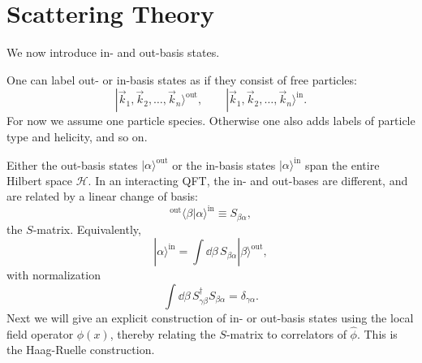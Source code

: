 \section{Scattering Theory}

We now introduce in- and out-basis states.

\begin{center}
\end{center}

One can label out- or in-basis states as if they consist of free particles:
\[
  |\vec k_1,\vec k_2,\ldots,\vec k_n\rangle^{\mathrm{out}},
  \qquad
  |\vec k_1,\vec k_2,\ldots,\vec k_n\rangle^{\mathrm{in}}.
\]
For now we assume one particle species. Otherwise one also adds labels of
particle type and helicity, and so on.

Either the out-basis states \(|\alpha\rangle^{\mathrm{out}}\) or the in-basis
states \(|\alpha\rangle^{\mathrm{in}}\) span the entire Hilbert space
\(\mathcal H\). In an interacting QFT, the in- and out-bases are different,
and are related by a linear change of basis:
\[
  {}^{\mathrm{out}}\langle\beta|\alpha\rangle^{\mathrm{in}}
  \equiv S_{\beta\alpha},
\]
the \(S\)-matrix. Equivalently,
\[
  |\alpha\rangle^{\mathrm{in}}
  =
  \int\dd\beta\,
  S_{\beta\alpha}|\beta\rangle^{\mathrm{out}},
\]
with normalization
\[
  \int\dd\beta\,
  S_{\gamma\beta}^{\dagger}S_{\beta\alpha}
  =
  \delta_{\gamma\alpha}.
\]
Next we will give an explicit construction of in- or out-basis states using
the local field operator \(\hat\phi(x)\), thereby relating the \(S\)-matrix to
correlators of \(\hat\phi\). This is the Haag-Ruelle construction.

